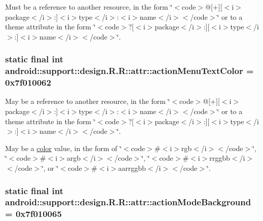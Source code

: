 Must be a reference to another resource, in the form \char`\"{}$<$code$>$@\mbox{[}+\mbox{]}\mbox{[}$<$i$>$package$<$/i$>$:\mbox{]}$<$i$>$type$<$/i$>$:$<$i$>$name$<$/i$>$$<$/code$>$\char`\"{} or to a theme attribute in the form \char`\"{}$<$code$>$?\mbox{[}$<$i$>$package$<$/i$>$:\mbox{]}\mbox{[}$<$i$>$type$<$/i$>$:\mbox{]}$<$i$>$name$<$/i$>$$<$/code$>$\char`\"{}. \hypertarget{classandroid_1_1support_1_1design_1_1_r_1_1attr_b0ca6ee91f1964e13cd6fc0de09dfb5c}{
\subsubsection[{actionMenuTextColor}]{\setlength{\rightskip}{0pt plus 5cm}static final int android::support::design.R.R::attr::actionMenuTextColor = 0x7f010062}}
\label{classandroid_1_1support_1_1design_1_1_r_1_1attr_b0ca6ee91f1964e13cd6fc0de09dfb5c}


May be a reference to another resource, in the form \char`\"{}$<$code$>$@\mbox{[}+\mbox{]}\mbox{[}$<$i$>$package$<$/i$>$:\mbox{]}$<$i$>$type$<$/i$>$:$<$i$>$name$<$/i$>$$<$/code$>$\char`\"{} or to a theme attribute in the form \char`\"{}$<$code$>$?\mbox{[}$<$i$>$package$<$/i$>$:\mbox{]}\mbox{[}$<$i$>$type$<$/i$>$:\mbox{]}$<$i$>$name$<$/i$>$$<$/code$>$\char`\"{}. 

May be a \hyperlink{classandroid_1_1support_1_1design_1_1_r_1_1color}{color} value, in the form of \char`\"{}$<$code$>$\#$<$i$>$rgb$<$/i$>$$<$/code$>$\char`\"{}, \char`\"{}$<$code$>$\#$<$i$>$argb$<$/i$>$$<$/code$>$\char`\"{}, \char`\"{}$<$code$>$\#$<$i$>$rrggbb$<$/i$>$$<$/code$>$\char`\"{}, or \char`\"{}$<$code$>$\#$<$i$>$aarrggbb$<$/i$>$$<$/code$>$\char`\"{}. \hypertarget{classandroid_1_1support_1_1design_1_1_r_1_1attr_5b33ee51c81e24c4e0f95a213948bc90}{
\subsubsection[{actionModeBackground}]{\setlength{\rightskip}{0pt plus 5cm}static final int android::support::design.R.R::attr::actionModeBackground = 0x7f010065}}
\label{classandroid_1_1support_1_1design_1_1_r_1_1attr_5b33ee51c81e24c4e0f95a213948bc90}


